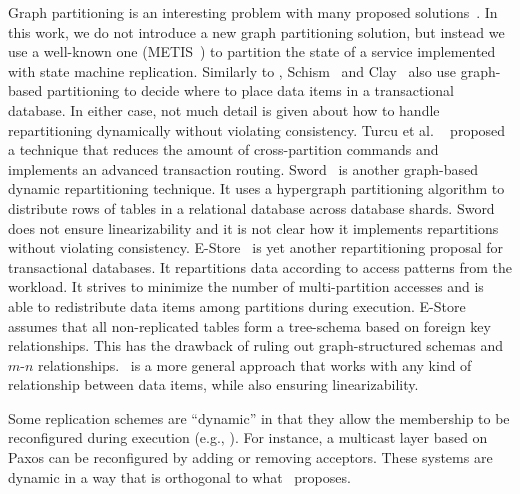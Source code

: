 Graph partitioning is an interesting problem with many proposed
solutions~\cite{Abou-Rjeili:2006,hendrickson2000graph,kernighan1970efficient,7004087}.
In this work, we do not introduce a new graph partitioning solution, but instead
we use a well-known one (METIS~\cite{Abou-Rjeili:2006}) to partition the state
of a service implemented with state machine replication. Similarly to
\dynastar{}, Schism~\cite{curino2010sch} and Clay~\cite{SerafiniTEPAS16} also
use graph-based partitioning to decide where to place data items in a
transactional database. In either case, not much detail is given about how to
handle repartitioning dynamically without violating consistency. Turcu et al.
~\cite{7004087} proposed a technique that reduces the amount of cross-partition
commands and implements an advanced transaction routing.
Sword~\cite{quamar2013sword} is another graph-based dynamic repartitioning
technique. It uses a hypergraph partitioning algorithm to distribute rows of
tables in a relational database across database shards. Sword does not ensure
linearizability and it is not clear how it implements repartitions without
violating consistency. E-Store~\cite{taft2014est} is yet another repartitioning
proposal for transactional databases. It repartitions data according to access
patterns from the workload. It strives to minimize the number of multi-partition
accesses and is able to redistribute data items among partitions during
execution. E-Store assumes that all non-replicated tables form a tree-schema
based on foreign key relationships. This has the drawback of ruling out
graph-structured schemas and \mbox{$m$-$n$} relationships. \dynastar\ is a more
general approach that works with any kind of relationship between data items,
while also ensuring linearizability.

Some replication schemes are ``dynamic'' in that they allow the membership to be
reconfigured during execution (e.g.,
\cite{birman2010dsr,dustdar2007soc,guessoum2003dar}). For instance, a multicast
layer based on Paxos can be reconfigured by adding or removing acceptors. These
systems are dynamic in a way that is orthogonal to what \dynastar\ proposes.


